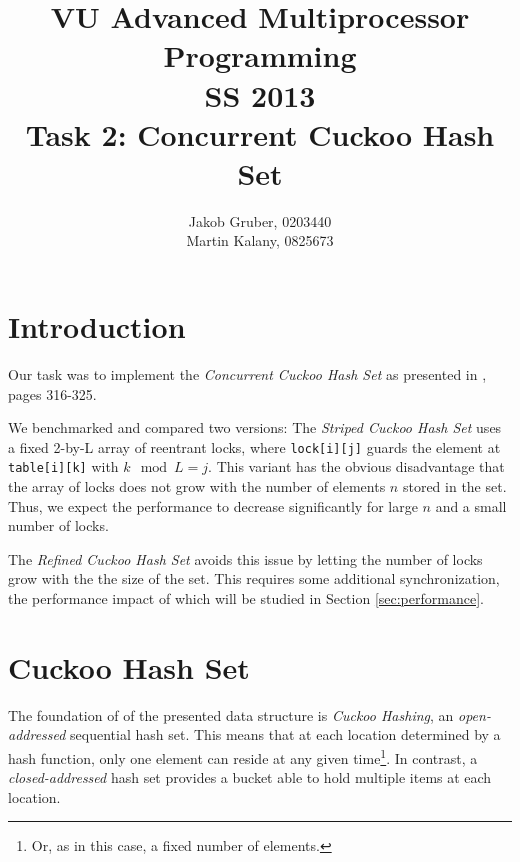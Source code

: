 \documentclass[a4paper,10pt]{article}
\title{VU Advanced Multiprocessor Programming \\
       SS 2013 \\
       Task 2: Concurrent Cuckoo Hash Set}
\author{Jakob Gruber, 0203440 \\
        Martin Kalany, 0825673}
\begin{document}
\maketitle

\begin{comment}
* Good theoretical analysis (invariants, linearizability, progress guarantees).
* Good benchmark analysis.
* Short document: 2-4 pages excluding plots and sourcecode. Description of data
  structure. Theoretical analysis. Benchmark (results, process).

+The Go implementation doesn't need either of these crutches. It's also designed
+to work without reentrant locks and thread ids.

TODO:
- which variant performs better when?
- asymptotic behaviour
- where is the cross-over point?
- anything unexpected?
\end{comment}

\section{Introduction}

Our task was to implement the \emph{Concurrent Cuckoo Hash Set} as presented
in \cite{herlihy}, pages 316-325. 

We benchmarked and compared two versions: The \emph{Striped Cuckoo Hash Set}
uses a fixed 2-by-L array of reentrant locks, where \lstinline|lock[i][j]|
guards the element at \lstinline|table[i][k]| with $k \mod L = j$. This variant
has the obvious disadvantage that the array of locks does not grow with the
number of elements $n$ stored in the set. Thus, we expect the performance to
decrease significantly for large $n$ and a small number of locks.

The \emph{Refined Cuckoo Hash Set} avoids this issue by letting the number of
locks grow with the the size of the set. This requires some additional
synchronization, the performance impact of which will be studied in Section
\ref{sec:performance}.

\section{Cuckoo Hash Set}

The foundation of of the presented data structure is \emph{Cuckoo Hashing},
an \textit{open-addressed} sequential hash set. This means that at each
location determined by a hash function, only one element can reside at any
given time\footnote{Or, as in this case, a fixed number of elements.}. In
contrast, a \emph{closed-addressed} hash set provides a bucket able to hold
multiple items at each location.
\end{document}
